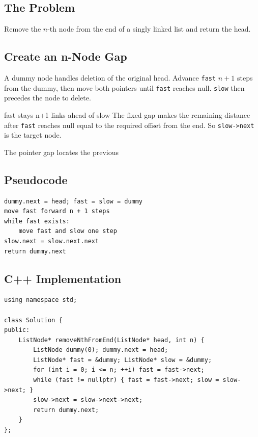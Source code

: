\subsection{The Problem}
Remove the \(n\)-th node from the end of a singly linked list and return the
head.

\subsection{Create an n-Node Gap}
A dummy node handles deletion of the original head. Advance \texttt{fast}
\(n+1\) steps from the dummy, then move both pointers until \texttt{fast}
reaches null. \texttt{slow} then precedes the node to delete.

\begin{invariantbox}{fast stays n+1 links ahead of slow}
The fixed gap makes the remaining distance after \texttt{fast} reaches null
equal to the required offset from the end. So \texttt{slow->next} is
the target node.
\end{invariantbox}

\begin{visualbox}{The pointer gap locates the previous}
\centering
{}
\end{visualbox}

\subsection{Pseudocode}
\begin{lstlisting}[style=pseudocode]
dummy.next = head; fast = slow = dummy
move fast forward n + 1 steps
while fast exists:
    move fast and slow one step
slow.next = slow.next.next
return dummy.next
\end{lstlisting}

\subsection{C++ Implementation}
\begin{lstlisting}[style=compactcode,caption={Complete C++ solution: Remove Nth Node From End}]
using namespace std;

class Solution {
public:
    ListNode* removeNthFromEnd(ListNode* head, int n) {
        ListNode dummy(0); dummy.next = head;
        ListNode* fast = &dummy; ListNode* slow = &dummy;
        for (int i = 0; i <= n; ++i) fast = fast->next;
        while (fast != nullptr) { fast = fast->next; slow = slow->next; }
        slow->next = slow->next->next;
        return dummy.next;
    }
};
\end{lstlisting}


